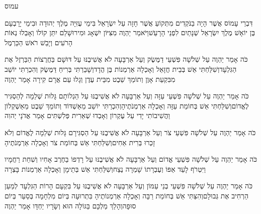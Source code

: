 \documentclass[../main/main.tex]{subfiles}
\begin{document}
\Incipit{}עמוס\par
\vspace{\afterchapskip}
\RTLmulticolcolumns
\begin{multicols}{\ncols}
דִּבְרֵי עָמוֹס אֲשֶׁר הָיָה בַנֹּקְדִים מִתְּקוֹעַ אֲשֶׁר חָזָה עַל יִשְׂרָאֵל בִּימֵי עֻזִּיָּה מֶלֶךְ יְהוּדָה וּבִימֵי יָרָבְעָם בֶּן יוֹאָשׁ מֶלֶךְ יִשְׂרָאֵל שְׁנָתַיִם לִפְנֵי הָרָעַשׁ\PreVerseSpace{}וַיֹּאמַר יַהְוֶה מִצִּיּוֹן יִשְׁאָג וּמִירוּשָׁלֵם יִתֵּן קוֹלוֹ וְאָבְלוּ נְאוֹת הָרֹעִים וְיָבֵשׁ רֹאשׁ הַכַּרְמֶל\OpenSection{}\par
{}כֹּה אָמַר יַהְוֶה עַל שְׁלֹשָׁה פִּשְׁעֵי דַמֶּשֶׂק וְעַל אַרְבָּעָה לֹא אֲשִׁיבֶנּוּ עַל דּוּשָׁם בַּחֲרֻצוֹת הַבַּרְזֶל אֶת הַגִּלְעָד\PreVerseSpace{}וְשִׁלַּחְתִּי אֵשׁ בְּבֵית חֲזָאֵל וְאָכְלָה אַרְמְנוֹת בֶּן הֲדָד\PreVerseSpace{}וְשָׁבַרְתִּי בְּרִיחַ דַּמֶּשֶׂק וְהִכְרַתִּי יוֹשֵׁב מִבִּקְעַת אָוֶן וְתוֹמֵךְ שֵׁבֶט מִבֵּית עֶדֶן וְגָלוּ עַם אֲרָם קִירָה אָמַר יַהְוֶה\OpenSection{}\par
{}כֹּה אָמַר יַהְוֶה עַל שְׁלֹשָׁה פִּשְׁעֵי עַזָּה וְעַל אַרְבָּעָה לֹא אֲשִׁיבֶנּוּ עַל הַגְלוֹתָם גָּלוּת שְׁלֵמָה לְהַסְגִּיר לֶאֱדוֹם\PreVerseSpace{}וְשִׁלַּחְתִּי אֵשׁ בְּחוֹמַת עַזָּה וְאָכְלָה אַרְמְנֹתֶיהָ\PreVerseSpace{}וְהִכְרַתִּי יוֹשֵׁב מֵאַשְׁדּוֹד וְתוֹמֵךְ שֵׁבֶט מֵאַשְׁקְלוֹן וַהֲשִׁיבוֹתִי יָדִי עַל עֶקְרוֹן וְאָבְדוּ שְׁאֵרִית פְּלִשְׁתִּים אָמַר אֲדֹנָי יְהוִה\OpenSection{}\par
{}כֹּה אָמַר יַהְוֶה עַל שְׁלֹשָׁה פִּשְׁעֵי צֹר וְעַל אַרְבָּעָה לֹא אֲשִׁיבֶנּוּ עַל הַסְגִּירָם גָּלוּת שְׁלֵמָה לֶאֱדוֹם וְלֹא זָכְרוּ בְּרִית אַחִים\PreVerseSpace{}וְשִׁלַּחְתִּי אֵשׁ בְּחוֹמַת צֹר וְאָכְלָה אַרְמְנֹתֶיהָ\OpenSection{}\par
{}כֹּה אָמַר יַהְוֶה עַל שְׁלֹשָׁה פִּשְׁעֵי אֱדוֹם וְעַל אַרְבָּעָה לֹא אֲשִׁיבֶנּוּ עַל רָדְפוֹ בַחֶרֶב אָחִיו וְשִׁחֵת רַחֲמָיו וַיִּטְרֹף לָעַד אַפּוֹ וְעֶבְרָתוֹ שָׁמְרָה\SubEnd{} נֶצַח\PreVerseSpace{}וְשִׁלַּחְתִּי אֵשׁ בְּתֵימָן וְאָכְלָה אַרְמְנוֹת בָּצְרָה\OpenSection{}\par
{}כֹּה אָמַר יַהְוֶה עַל שְׁלֹשָׁה פִּשְׁעֵי בְנֵי עַמּוֹן וְעַל אַרְבָּעָה לֹא אֲשִׁיבֶנּוּ עַל בִּקְעָם הָרוֹת הַגִּלְעָד לְמַעַן הַרְחִיב אֶת גְּבוּלָם\PreVerseSpace{}וְהִצַּתִּי אֵשׁ בְּחוֹמַת רַבָּה וְאָכְלָה אַרְמְנוֹתֶיהָ בִּתְרוּעָה בְּיוֹם מִלְחָמָה בְּסַעַר בְּיוֹם סוּפָה\PreVerseSpace{}וְהָלַךְ מַלְכָּם בַּגּוֹלָה הוּא וְשָׂרָיו יַחְדָּו אָמַר יַהְוֶה\OpenSection{}\par

\end{multicols}
\end{document}
